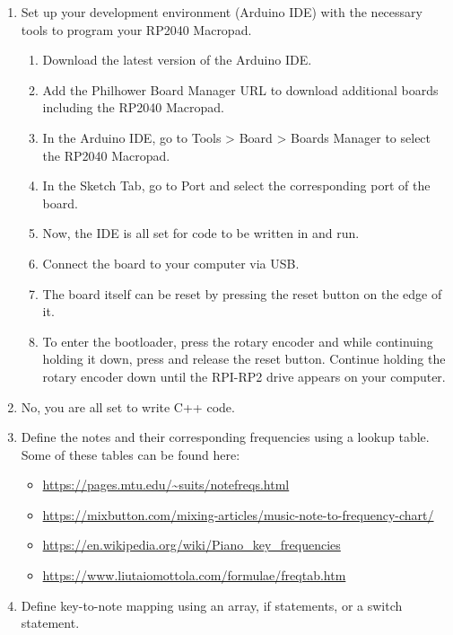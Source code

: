 \documentclass{article}
\begin{document}
\begin{enumerate}
    \item Set up your development environment (Arduino IDE) with the necessary tools to program your RP2040 Macropad.
    \begin{enumerate}
        \item Download the latest version of the Arduino IDE.
        \item Add the Philhower Board Manager URL to download additional boards including the RP2040 Macropad.
        \item In the Arduino IDE, go to Tools \textgreater{} Board \textgreater{} Boards Manager to select the RP2040 Macropad. 
        \item In the Sketch Tab, go to Port and select the corresponding port of the board.
        \item Now, the IDE is all set for code to be written in and run.
        \item Connect the board to your computer via USB.
        \item The board itself can  be reset by pressing the reset button on the edge of it.
        \item To enter the bootloader, press the rotary encoder and while continuing holding it down, press and release the reset button. Continue holding the rotary encoder down until the RPI-RP2 drive appears on your computer. 
    \end{enumerate}

    \item No, you are all set to write C++ code.
    
    \item Define the notes and their corresponding frequencies using a lookup table. Some of these tables can be found here:
    \begin{itemize}
        \item \url{https://pages.mtu.edu/~suits/notefreqs.html}
        \item \url{https://mixbutton.com/mixing-articles/music-note-to-frequency-chart/}
        \item \url{https://en.wikipedia.org/wiki/Piano_key_frequencies}
        \item \url{https://www.liutaiomottola.com/formulae/freqtab.htm}
    \end{itemize}
    
    \item Define key-to-note mapping using an array, if statements, or a switch statement.


\end{enumerate}
\end{document}
